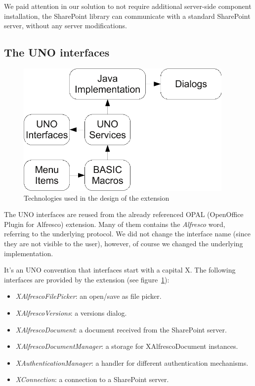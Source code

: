 We paid attention in our solution to not require additional server-side component
installation, the SharePoint library can communicate with a standard SharePoint
server, without any server modifications.

\subsection{The UNO interfaces}

\begin{figure}[H]
\centering
\includegraphics[width=400px,keepaspectratio]{design-technologies.pdf}
\caption{Technologies used in the design of the extension}
\label{fig:design-technologies}
\end{figure}

The UNO interfaces are reused from the already referenced OPAL (OpenOffice
Plugin for Alfresco) extension. Many of them contains the \emph{Alfresco} word,
referring to the underlying protocol. We did not change the interface name
(since they are not visible to the user), however, of course we changed the
underlying implementation.

It's an UNO convention that interfaces start with a capital X. The following
interfaces are provided by the extension (see figure~\ref{fig:design-technologies}):

\begin{itemize}
\item \emph{XAlfrescoFilePicker}: an open/save as file picker.
\item \emph{XAlfrescoVersions}: a versions dialog.
\item \emph{XAlfrescoDocument}: a document received from the
SharePoint server.
\item \emph{XAlfrescoDocumentManager}: a storage for XAlfrescoDocument instances.
\item \emph{XAuthenticationManager}: a handler for different authentication mechanisms.
\item \emph{XConnection}: a connection to a SharePoint server.
\end{itemize}

